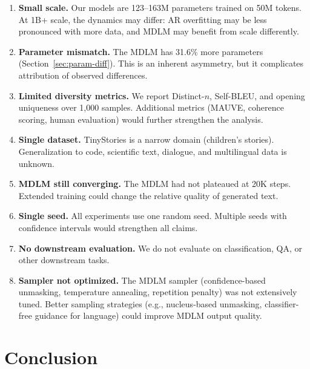 \documentclass[11pt,a4paper]{article}
\begin{document}
\begin{enumerate}[leftmargin=*,itemsep=2pt]
  \item \textbf{Small scale.}
  Our models are 123--163M parameters trained on 50M tokens.
  At 1B+ scale, the dynamics may differ: AR overfitting may be less pronounced with more data, and MDLM may benefit from scale differently.

  \item \textbf{Parameter mismatch.}
  The MDLM has 31.6\% more parameters (Section~\ref{sec:param-diff}).
  This is an inherent asymmetry, but it complicates attribution of observed differences.

  \item \textbf{Limited diversity metrics.}
  We report Distinct-$n$, Self-BLEU, and opening uniqueness over 1{,}000 samples. Additional metrics (MAUVE, coherence scoring, human evaluation) would further strengthen the analysis.

  \item \textbf{Single dataset.}
  TinyStories is a narrow domain (children's stories).
  Generalization to code, scientific text, dialogue, and multilingual data is unknown.

  \item \textbf{MDLM still converging.}
  The MDLM had not plateaued at 20K steps.
  Extended training could change the relative quality of generated text.

  \item \textbf{Single seed.}
  All experiments use one random seed.
  Multiple seeds with confidence intervals would strengthen all claims.

  \item \textbf{No downstream evaluation.}
  We do not evaluate on classification, QA, or other downstream tasks.

  \item \textbf{Sampler not optimized.}
  The MDLM sampler (confidence-based unmasking, temperature annealing, repetition penalty) was not extensively tuned.
  Better sampling strategies (e.g., nucleus-based unmasking, classifier-free guidance for language) could improve MDLM output quality.
\end{enumerate}

\section{Conclusion}
\end{document}
